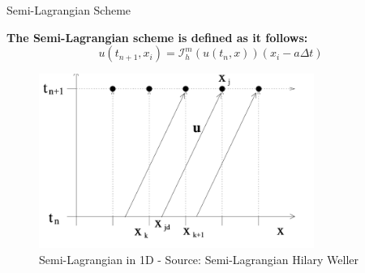 \begin{frame}{Semi-Lagrangian Scheme}
    
    \textbf{The Semi-Lagrangian scheme is defined as it follows:}
    \centering
    \begin{equation*}
        u\left(t_{n+1}, x_i\right)=\mathcal{I}_h^m\left(u\left(t_n, x\right)\right)\left(x_i-a \Delta t\right)
    \end{equation*}

    \vspace{0.3cm}

    \begin{figure}
        \centering
        \includegraphics[width=0.8\textwidth]{images/11.png}
        \caption{Semi-Lagrangian in 1D - Source: Semi-Lagrangian Hilary Weller}
    \end{figure}

\end{frame}